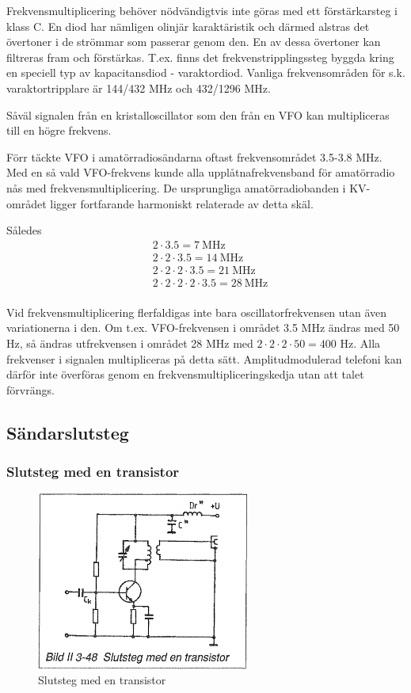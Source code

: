 Frekvensmultiplicering behöver nödvändigtvis inte göras med ett
förstärkarsteg i klass C. En diod har nämligen olinjär karaktäristik
och därmed alstras det övertoner i de strömmar som passerar genom
den. En av dessa övertoner kan filtreras fram och
förstärkas. T.ex. finns det frekvenstripplingssteg byggda kring en
speciell typ av kapacitansdiod - varaktordiod. Vanliga frekvensområden
för s.k. varaktortripplare är 144/432 MHz och 432/1296 MHz.

Såväl signalen från en kristalloscillator som den från en VFO kan
multipliceras till en högre frekvens.

Förr täckte VFO i amatörradiosändarna oftast frekvensområdet 3.5-3.8
MHz. Med en så vald VFO-frekvens kunde alla upplåtnafrekvensband för
amatörradio nås med frekvensmultiplicering. De ursprungliga
amatörradiobanden i KV-området ligger fortfarande harmoniskt
relaterade av detta skäl.

Således
\begin{align*}
  &2 \cdot 3.5 = 7\ \text{MHz} \\
  &2 \cdot 2 \cdot 3.5 = 14\ \text{MHz} \\
  &2 \cdot 2 \cdot 2 \cdot 3.5 = 21\ \text{MHz} \\
  &2 \cdot 2 \cdot 2 \cdot 2 \cdot 3.5 = 28\ \text{MHz} \\
\end{align*}

Vid frekvensmultiplicering flerfaldigas inte bara oscillatorfrekvensen
utan även variationerna i den. Om t.ex. VFO-frekvensen i området 3.5
MHz ändras med 50 Hz, så ändras utfrekvensen i området 28 MHz med \(2
\cdot 2 \cdot 2 \cdot 50 = 400\) Hz. Alla frekvenser i signalen
multipliceras på detta sätt. Amplitudmodulerad telefoni kan därför
inte överföras genom en frekvensmultipliceringskedja utan att talet
förvrängs.

\subsection{Sändarslutsteg}

\subsubsection{Slutsteg med en transistor}

\begin{figure}[h]
\begin{center}
\includegraphics[width=7cm]{images/bild_2_3-48}
\caption{Slutsteg med en transistor}
\label{fig:BildII3-48}
\end{center}
\end{figure}

